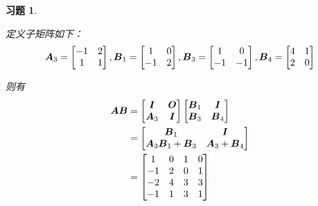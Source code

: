\documentclass{ctexart}
\newtheorem{problem}{习题}[section]
\begin{document}
\begin{problem}\

定义子矩阵如下：
\begin{equation*}
    \boldsymbol{A}_3=
    \begin{bmatrix}
        -1 & 2 \\1&1
    \end{bmatrix},
    \boldsymbol{B}_1=
    \begin{bmatrix}
        1 & 0 \\-1&2
    \end{bmatrix},
    \boldsymbol{B}_3=
    \begin{bmatrix}
        1 & 0 \\-1&-1
    \end{bmatrix},
    \boldsymbol{B}_4=
    \begin{bmatrix}
        4 & 1 \\2&0
    \end{bmatrix}
\end{equation*}

则有
\begin{align*}
    \boldsymbol{A}\boldsymbol{B} & =
    \begin{bmatrix}
        \boldsymbol{I} & \boldsymbol{O} \\\boldsymbol{A}_3&\boldsymbol{I}
    \end{bmatrix}
    \begin{bmatrix}
        \boldsymbol{B}_1 & \boldsymbol{I} \\\boldsymbol{B}_3&\boldsymbol{B}_4
    \end{bmatrix}                        \\&=
    \begin{bmatrix}
        \boldsymbol{B}_1 & \boldsymbol{I} \\\boldsymbol{A}_3\boldsymbol{B}_1+\boldsymbol{B}_3&\boldsymbol{A}_3+\boldsymbol{B}_4
    \end{bmatrix} \\&=
    \begin{bmatrix}
        1  & 0 & 1 & 0 \\
        -1 & 2 & 0 & 1 \\
        -2 & 4 & 3 & 3 \\
        -1 & 1 & 3 & 1
    \end{bmatrix}
\end{align*}

\end{problem}
\end{document}

